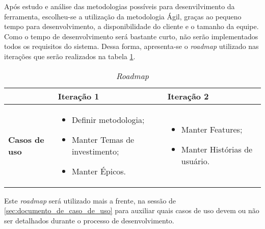 Após estudo e análise das metodologias possíveis para desenvilvimento da ferramenta, escolheu-se a utilização da metodologia Ágil, graças ao pequeno tempo para desenvolvimento, a disponibilidade do cliente e o tamanho da equipe. Como o tempo de desenvolvimento será bastante curto, não serão implementados todos os requisitos do sistema. Dessa forma, apresenta-se o \textit{roadmap} utilizado nas iterações que serão realizados na tabela \ref{tab:primeiro_roadmap}.

\vspace{5mm}
\begin{table}[h]
\centering
\begin{tabular}{p{1cm}|p{6cm}|p{}|}

\cline{2-3} &
\textbf{Iteração 1} &
\textbf{Iteração 2}
\\ \hline
\multicolumn{1}{|p{1cm}|}{\textbf{Casos de uso}} &
\begin{itemize}
 	\item {Definir metodologia};
 	\item Manter Temas de investimento;
	\item Manter Épicos.
\end{itemize} &
\begin{itemize}
 	\item Manter Features;
	\item Manter Histórias de usuário.
 \end{itemize} 
 \\ \hline
\end{tabular}
\caption{\textit{Roadmap}}
\label{tab:primeiro_roadmap}
\end{table}

Este \textit{roadmap} será utilizado mais a frente, na sessão de \ref{sec:documento_de_caso_de_uso} para auxiliar quais casos de uso devem ou não ser detalhados durante o processo de desenvolvimento.